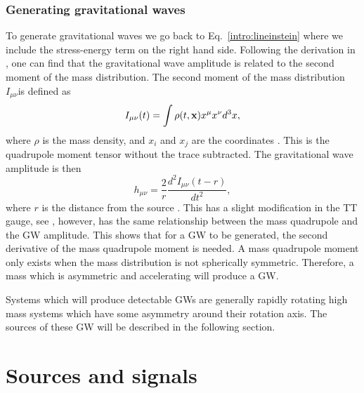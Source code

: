 \subsubsection{Generating gravitational waves}

To generate gravitational waves we go back to Eq.~\ref{intro:lineinstein} where we include the stress-energy term on the right hand side.
Following the derivation in \citep{flanagan2005BasicsGravitational}, one can find that the gravitational wave amplitude is related to the second moment of the mass distribution.
The second moment of the mass distribution $I_{\mu\nu}$is defined as
\begin{equation}
    I_{\mu \nu}(t) = \int \rho(t,{\bf x}) x^\mu x^\nu d^3x,
\end{equation}
where $\rho$ is the mass density, and $x_i$ and $x_j$ are the coordinates \citep{flanagan2005BasicsGravitational}. 
This is the quadrupole moment tensor without the trace subtracted.
The gravitational wave amplitude is then
\begin{equation}
\label{intro:gravwave:amp}
    h_{\mu \nu} = \frac{2}{r}  \frac{d^2 I_{\mu \nu}(t-r)}{dt^2},
\end{equation}
where $r$ is the distance from the source \citep{letiec2016TheoryGravitational}.
This has a slight modification in the TT gauge, see \citep{flanagan2005BasicsGravitational}, however, has the same relationship between the mass quadrupole and the \gls{GW} amplitude.
This shows that for a \gls{GW} to be generated, the second derivative of the mass quadrupole moment is needed.
A mass quadrupole moment only exists when the mass distribution is not spherically symmetric.
Therefore, a mass which is asymmetric and accelerating will produce a \gls{GW}.

Systems which will produce detectable \glspl{GW} are generally rapidly rotating high mass systems which have some asymmetry around their rotation axis.
The sources of these \gls{GW} will be described in the following section.



\section{\label{intro:sources}Sources and signals}

